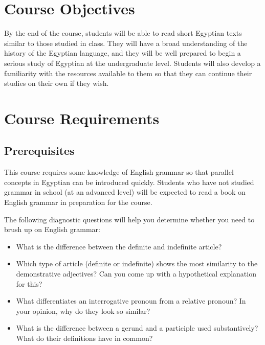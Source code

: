 \documentclass[11pt]{article}
\begin{document}
		
		
	\section*{Course Objectives}
	
		By the end of the course, students will be able to read short Egyptian texts similar to those studied in class. They will have a broad understanding of the history of the Egyptian language, and they will be well prepared to begin a serious study of Egyptian at the undergraduate level. Students will also develop a familiarity with the resources available to them so that they can continue their studies on their own if they wish.
	
	
	\section*{Course Requirements}
	
	\subsection*{Prerequisites}
		
		This course requires some knowledge of English grammar so that parallel concepts in Egyptian can be introduced quickly. 
		Students who have not studied grammar in school (at an advanced level) will be expected to read a book on English grammar in preparation for the course.
		
		
		The following diagnostic questions will help you determine whether you need to brush up on English grammar:
		\begin{itemize}
			\item What is the difference between the definite and indefinite article?
			\item Which type of article (definite or indefinite) shows the most similarity to the demonstrative adjectives? Can you come up with a hypothetical explanation for this?
			\item What differentiates an interrogative pronoun from a relative pronoun? In your opinion, why do they look so similar?
			\item What is the difference between a gerund and a participle used substantively? What do their definitions have in common?
		\end{itemize}
		
\end{document}
